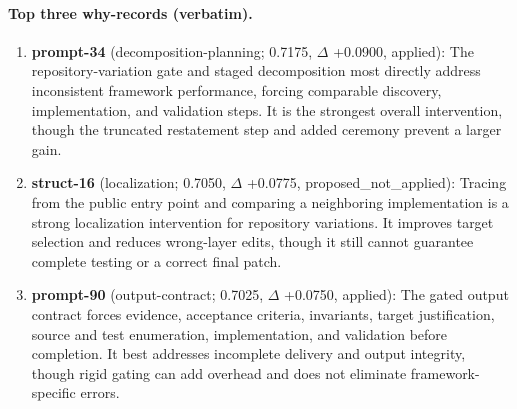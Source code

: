 \paragraph{Top three why-records (verbatim).}\begin{enumerate}\itemsep1pt
\item \textbf{prompt-34} (decomposition-planning; 0.7175, $\Delta$ +0.0900, applied): The repository-variation gate and staged decomposition most directly address inconsistent framework performance, forcing comparable discovery, implementation, and validation steps. It is the strongest overall intervention, though the truncated restatement step and added ceremony prevent a larger gain.
\item \textbf{struct-16} (localization; 0.7050, $\Delta$ +0.0775, proposed\_not\_applied): Tracing from the public entry point and comparing a neighboring implementation is a strong localization intervention for repository variations. It improves target selection and reduces wrong-layer edits, though it still cannot guarantee complete testing or a correct final patch.
\item \textbf{prompt-90} (output-contract; 0.7025, $\Delta$ +0.0750, applied): The gated output contract forces evidence, acceptance criteria, invariants, target justification, source and test enumeration, implementation, and validation before completion. It best addresses incomplete delivery and output integrity, though rigid gating can add overhead and does not eliminate framework-specific errors.
\end{enumerate}
